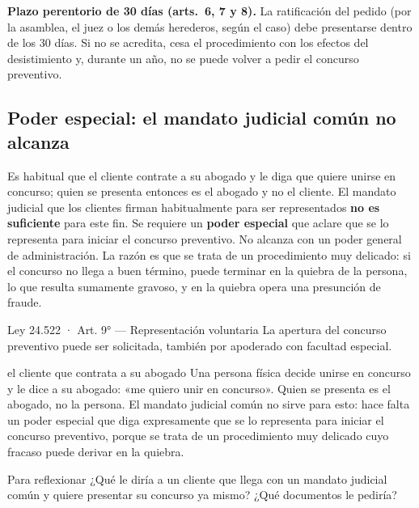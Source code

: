 \documentclass[12pt,oneside]{book}
\begin{document}
\begin{important}
\textbf{Plazo perentorio de 30 días (arts.~6, 7 y 8).} La ratificación del pedido (por la asamblea, el juez o los demás herederos, según el caso) debe presentarse dentro de los 30 días. Si no se acredita, cesa el procedimiento con los efectos del desistimiento y, durante un año, no se puede volver a pedir el concurso preventivo.
\end{important}

\subsection{Poder especial: el mandato judicial común no alcanza}

Es habitual que el cliente contrate a su abogado y le diga que quiere unirse en concurso; quien se presenta entonces es el abogado y no el cliente. El mandato judicial que los clientes firman habitualmente para ser representados \textbf{no es suficiente} para este fin. Se requiere un \textbf{poder especial} que aclare que se lo representa para iniciar el concurso preventivo. No alcanza con un poder general de administración. La razón es que se trata de un procedimiento muy delicado: si el concurso no llega a buen término, puede terminar en la quiebra de la persona, lo que resulta sumamente gravoso, y en la quiebra opera una presunción de fraude.

\begin{norma}{Ley 24.522 · Art. 9° — Representación voluntaria}
La apertura del concurso preventivo puede ser solicitada, también por apoderado con facultad especial.
\end{norma}

\begin{example}{el cliente que contrata a su abogado}
Una persona física decide unirse en concurso y le dice a su abogado: «me quiero unir en concurso». Quien se presenta es el abogado, no la persona. El mandato judicial común no sirve para esto: hace falta un poder especial que diga expresamente que se lo representa para iniciar el concurso preventivo, porque se trata de un procedimiento muy delicado cuyo fracaso puede derivar en la quiebra.
\end{example}

\begin{exercise}{Para reflexionar}
¿Qué le diría a un cliente que llega con un mandato judicial común y quiere presentar su concurso ya mismo? ¿Qué documentos le pediría?
\end{exercise}
\end{document}
